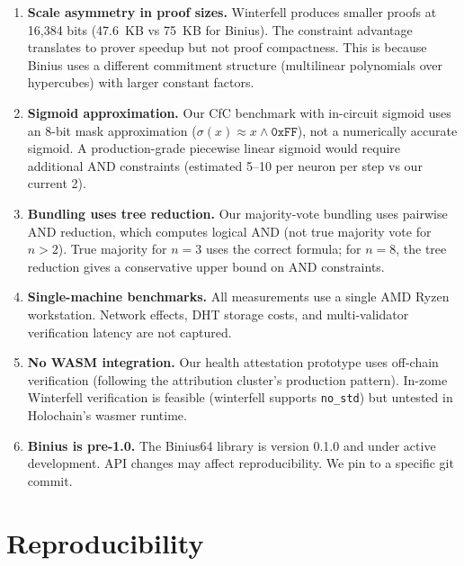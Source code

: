\documentclass[11pt,twocolumn]{article}
\begin{document}
\begin{enumerate}
    \item \textbf{Scale asymmetry in proof sizes.} Winterfell produces smaller proofs at 16,384 bits (47.6~KB vs 75~KB for Binius). The constraint advantage translates to prover speedup but not proof compactness. This is because Binius uses a different commitment structure (multilinear polynomials over hypercubes) with larger constant factors.

    \item \textbf{Sigmoid approximation.} Our CfC benchmark with in-circuit sigmoid uses an 8-bit mask approximation ($\sigma(x) \approx x \wedge \texttt{0xFF}$), not a numerically accurate sigmoid. A production-grade piecewise linear sigmoid would require additional AND constraints (estimated 5--10 per neuron per step vs our current 2).

    \item \textbf{Bundling uses tree reduction.} Our majority-vote bundling uses pairwise AND reduction, which computes logical AND (not true majority vote for $n > 2$). True majority for $n = 3$ uses the correct formula; for $n = 8$, the tree reduction gives a conservative upper bound on AND constraints.

    \item \textbf{Single-machine benchmarks.} All measurements use a single AMD Ryzen workstation. Network effects, DHT storage costs, and multi-validator verification latency are not captured.

    \item \textbf{No WASM integration.} Our health attestation prototype uses off-chain verification (following the attribution cluster's production pattern). In-zome Winterfell verification is feasible (winterfell supports \texttt{no\_std}) but untested in Holochain's wasmer runtime.

    \item \textbf{Binius is pre-1.0.} The Binius64 library is version 0.1.0 and under active development. API changes may affect reproducibility. We pin to a specific git commit.
\end{enumerate}

\section{Reproducibility}
\end{document}
